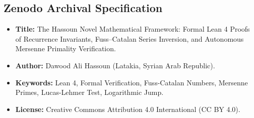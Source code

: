 \documentclass[11pt,a4paper]{article}
\theoremstyle{definition}
\begin{document}
\subsection*{Zenodo Archival Specification}
\begin{itemize}
    \item \textbf{Title:} The Hassoun Novel Mathematical Framework: Formal Lean 4 Proofs of Recurrence Invariants, Fuss--Catalan Series Inversion, and Autonomous Mersenne Primality Verification.
    \item \textbf{Author:} Dawood Ali Hassoun (Latakia, Syrian Arab Republic).
    \item \textbf{Keywords:} Lean 4, Formal Verification, Fuss-Catalan Numbers, Mersenne Primes, Lucas-Lehmer Test, Logarithmic Jump.
    \item \textbf{License:} Creative Commons Attribution 4.0 International (CC BY 4.0).
\end{itemize}
\end{document}
